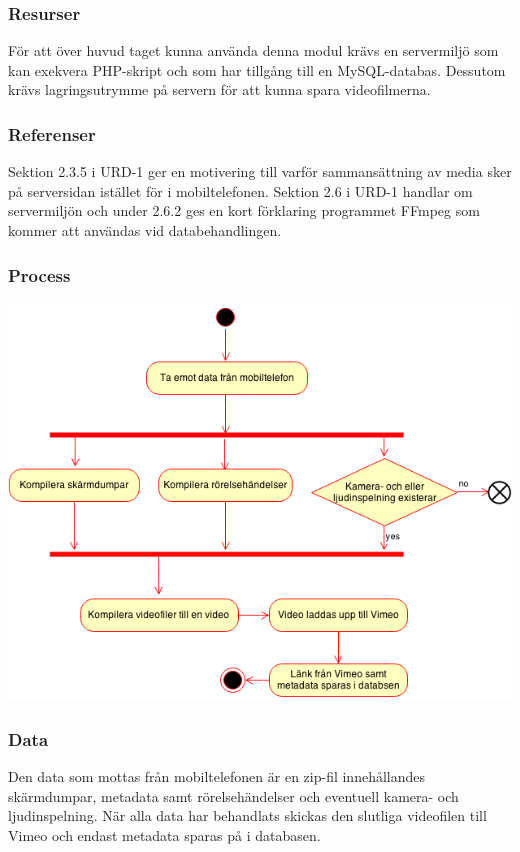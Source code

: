 \subsubsection{Resurser}
För att över huvud taget kunna använda denna modul krävs en servermiljö som kan exekvera PHP-skript och som har tillgång till en MySQL-databas. Dessutom krävs lagringsutrymme på servern för att kunna spara videofilmerna.

\subsubsection{Referenser}
Sektion 2.3.5 i URD-1 ger en motivering till varför sammansättning av media sker på serversidan istället för i mobiltelefonen. Sektion 2.6 i URD-1 handlar om servermiljön och under 2.6.2 ges en kort förklaring programmet FFmpeg som kommer att användas vid databehandlingen.

\subsubsection{Process}
\includegraphics[scale=0.6]{dataprocessing.png}

\subsubsection{Data}
Den data som mottas från mobiltelefonen är en zip-fil innehållandes skärmdumpar, metadata samt rörelsehändelser och eventuell kamera- och ljudinspelning. När alla data har behandlats skickas den slutliga videofilen till Vimeo och endast metadata sparas på i databasen.
